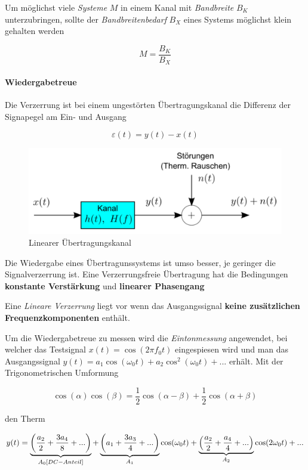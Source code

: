 \documentclass[
  10pt,
  a4paper,
  german]{article}
\let\oldparagraph\paragraph
\renewcommand{\paragraph}[1]{\oldparagraph{#1}\mbox{}}
\numberwithin{equation}{section}
\let\paragraph\oldparagraph
\renewcommand{\paragraph}[1]{\oldparagraph{#1}\mbox{}\par}
\begin{document}
Um möglichst viele \emph{Systeme} \(M\) in einem Kanal mit
\emph{Bandbreite} \(B_K\) unterzubringen, sollte der
\emph{Bandbreitenbedarf} \(B_X\) eines Systems möglichst klein gehalten
werden

\[
M=\frac{B_K}{B_X}
\]

\hypertarget{wiedergabetreue}{%
\paragraph{Wiedergabetreue}\label{wiedergabetreue}}

Die Verzerrung ist bei einem ungestörten Übertragungskanal die Differenz
der Signapegel am Ein- und Ausgang

\[
\varepsilon(t)=y(t)-x(t)
\]

\begin{figure}[H]

{\centering \includegraphics{images/01_Wiedergabetreue.png}

}

\caption{Linearer Übertragungskanal}

\end{figure}

Die Wiedergabe eines Übertragunssystems ist umso besser, je geringer die
Signalverzerrung ist. Eine Verzerrungsfreie Übertragung hat die
Bedingungen \textbf{konstante Verstärkung} und \textbf{linearer
Phasengang}

Eine \emph{Lineare Verzerrung} liegt vor wenn das Ausgangssignal
\textbf{keine zusätzlichen Frequenzkomponenten} enthält.

Um die Wiedergabetreue zu messen wird die \emph{Eintonmessung}
angewendet, bei welcher das Testsignal \(x(t) = \cos(2\pi f_0t)\)
eingespiesen wird und man das Ausgangssignal
\(y(t)=a_1\cos(\omega_0t)+a_2\cos^2(\omega_0t)+...\) erhält. Mit der
Trigonometrischen Umformung

\[
\cos(\alpha)\cos(\beta)=\frac12\cos(\alpha-\beta)+\frac12\cos(\alpha+\beta)
\]

den Therm

\[
y(t)=\underbrace{\left(\frac{a_2}{2}+\frac{3a_4}{8}+...\right)}_{A_0 \space[DC-Anteil]}+
\underbrace{\left(a_1+\frac{3a_3}{4}+...\right)}_{A_1}\cos(\omega_0t)+
\underbrace{\left(\frac{a_2}{2}+\frac{a_4}{4}+...\right)}_{A_2}\cos(2\omega_0t)+...
\]
\end{document}
